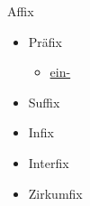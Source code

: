 \begin{semantics}{Affix}{}
\begin{itemize}
	\item Präfix
		\begin{itemize}
			\item \href{https://de.wiktionary.org/wiki/ein-}{ein-}
		\end{itemize}
	\item Suffix
	\item Infix
	\item Interfix
	\item Zirkumfix
\end{itemize}
\end{semantics}
